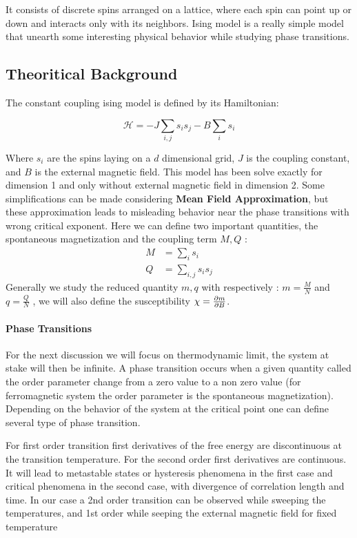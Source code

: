 \documentclass[ansiapaper]{report}
\begin{document}
\begin{multicols}{3}
 It consists of discrete spins arranged on a lattice, where each spin can point up or down and interacts only with its neighbors. Ising model is a really simple model that unearth some interesting physical behavior while studying phase transitions. 
\subsection{Theoritical Background}
The constant coupling ising model is defined by its Hamiltonian:

 $$ \mathcal{H} = -J \sum_{i,j} s_i s_j -B \sum_{i} s_i $$

Where \( s_i \) are the spins laying on a $d$ dimensional grid, \( J \) is the coupling constant, and \( B \) is the external magnetic field. This model has been solve exactly for dimension 1 and only without external magnetic field in dimension 2. Some simplifications can be made considering \textbf{Mean Field Approximation}, but these approximation leads to misleading behavior near the phase transitions with wrong critical exponent. Here we can define two important quantities, the spontaneous magnetization and the coupling term $M, Q$ :
    \begin{align*}
        M &=  \sum_{i} s_i \\
        Q &= \sum_{i,j} s_i s_j
    \end{align*}
Generally we study the reduced quantity $m, q$ with respectively : $m = \frac{M}{N}$ and $q = \frac{Q}{N}$
, we will also define the susceptibility $\chi = \pdv{m}{B}$. 
\paragraph*{Phase Transitions}
For the next discussion we will focus on thermodynamic limit, the system at stake will then be infinite. 
A phase transition occurs when a given quantity called the order parameter change from a zero value to a non zero value (for ferromagnetic system the order parameter is the spontaneous magnetization). Depending on the behavior of the system at the critical point one can define several type of phase transition.  


For first order transition first derivatives of the free energy are discontinuous at the
transition temperature. For the second order first derivatives are continuous. It will lead to metastable states or hysteresis phenomena in the first case and critical phenomena in the second case, with divergence of correlation length and time. In our case a 2nd order transition can be observed while sweeping the temperatures, and 1st order while seeping the external magnetic field for fixed temperature


\end{multicols}
\end{document}
